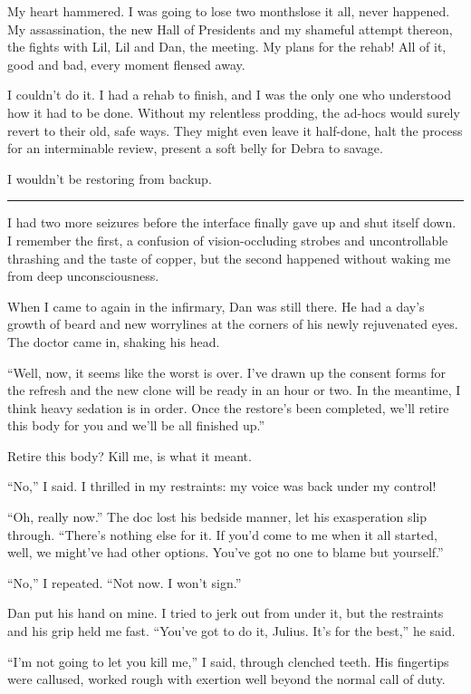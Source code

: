 My heart hammered. I was going to lose two months{\dash}lose it all,
never happened. My assassination, the new Hall of Presidents and my
shameful attempt thereon, the fights with Lil, Lil and Dan, the
meeting. My plans for the rehab! All of it, good and bad, every
moment flensed away.

I couldn't do it. I had a rehab to finish, and I was the only one
who understood how it had to be done. Without my relentless
prodding, the ad-hocs would surely revert to their old, safe ways.
They might even leave it half-done, halt the process for an
interminable review, present a soft belly for Debra to savage.

I wouldn't be restoring from backup.

\begin{center}\rule{1in}{0.4pt}\end{center}

I had two more seizures before the interface finally gave up and
shut itself down. I remember the first, a confusion of
vision-occluding strobes and uncontrollable thrashing and the taste
of copper, but the second happened without waking me from deep
unconsciousness.

When I came to again in the infirmary, Dan was still there. He had
a day's growth of beard and new worrylines at the corners of his
newly rejuvenated eyes. The doctor came in, shaking his head.

“Well, now, it seems like the worst is over. I've drawn up the
consent forms for the refresh and the new clone will be ready in an
hour or two. In the meantime, I think heavy sedation is in order.
Once the restore's been completed, we'll retire this body for you
and we'll be all finished up.”

Retire this body? Kill me, is what it meant.

“No,” I said. I thrilled in my restraints: my voice was back under
my control!

“Oh, really now.” The doc lost his bedside manner, let his
exasperation slip through. “There's nothing else for it. If you'd
come to me when it all started, well, we might've had other
options. You've got no one to blame but yourself.”

“No,” I repeated. “Not now. I won't sign.”

Dan put his hand on mine. I tried to jerk out from under it, but
the restraints and his grip held me fast. “You've got to do it,
Julius. It's for the best,” he said.

“I'm not going to let you kill me,” I said, through clenched teeth.
His fingertips were callused, worked rough with exertion well
beyond the normal call of duty.

